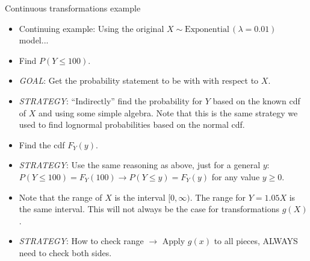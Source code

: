 \documentclass{article}
\newcommand{\follow}[1]{\sim \text{#1}\,}		%
\begin{document}
Continuous transformations example\bigskip
\begin{itemize}
    \item Continuing example: Using the original $X \follow{Exponential}(\lambda = 0.01)$ model...
    \item Find $P(Y \le 100)$.
    \item[] \textit{GOAL}: Get the probability statement to be with with respect to $X$.
    \item[] \textit{STRATEGY}: ``Indirectly'' find the probability for $Y$ based on the known cdf of $X$ and using some simple algebra. Note that this is the same strategy we used to find lognormal probabilities based on the normal cdf.\vspace{150pt}
    \item Find the cdf $F_Y(y)$.
    \item[] \textit{STRATEGY}: Use the same reasoning as above, just for a general $y$:\\ $P(Y \le 100) = F_Y(100) \longrightarrow P(Y \le y) = F_Y(y)$ for any value $y \ge 0$.\vspace{150pt}
    \item Note that the range of $X$ is the interval $[0, \infty)$. The range for $Y = 1.05X$ is the same interval. This will not always be the case for transformations $g(X)$.
    \item[] \textit{STRATEGY}: How to check range $\rightarrow$ Apply $g(x)$ to all pieces, ALWAYS need to check both sides.\vspace{20pt}
\end{itemize}\bigskip
\end{document}
